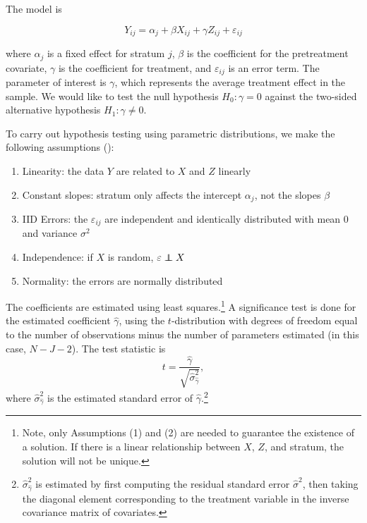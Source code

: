 \documentclass[11pt]{article}
\newcommand{\todo}[1]{{\color{red}{TO DO: \sc #1}}}
\newcommand{\eps}{\varepsilon}
\newcommand\independent{\protect\mathpalette{\protect\independenT}{\perp}}
\def\independenT#1#2{\mathrel{\rlap{$#1#2$}\mkern2mu{#1#2}}}
\begin{document}
The model is

$$Y_{ij} = \alpha_j + \beta X_{ij} + \gamma Z_{ij} + \eps_{ij}$$

where $\alpha_j$ is a fixed effect for stratum $j$, $\beta$ is the coefficient for the pretreatment covariate,
$\gamma$ is the coefficient for treatment,
and $\eps_{ij}$ is an error term.
The parameter of interest is $\gamma$, which represents the average treatment effect in the sample. 
We would like to test the null hypothesis $H_0: \gamma = 0$ against
the two-sided alternative hypothesis $H_1: \gamma \neq 0$.

To carry out hypothesis testing using parametric distributions, we make the following assumptions (\cite{freedman_statistical_2005}):

\begin{enumerate}
\item Linearity: the data $Y$ are related to $X$ and $Z$ linearly
\item Constant slopes: stratum only affects the intercept $\alpha_j$, not the slopes $\beta$
\item IID Errors: the $\eps_{ij}$ are independent and identically distributed with mean $0$ and variance $\sigma^2$
\item Independence: if $X$ is random, $\eps \independent X$
\item Normality: the errors are normally distributed
\end{enumerate}

The coefficients are estimated using least squares.\footnote{
Note, only Assumptions (1) and (2) are needed to guarantee the existence of a solution.
If there is a linear relationship between $X$, $Z$, and stratum, the solution will not be unique.
}
A significance test is done for the estimated coefficient $\hat{\gamma}$, using the $t$-distribution with degrees of freedom equal to the number of observations minus the number of parameters estimated (in this case, $N - J - 2$).
The test statistic is
$$ t = \frac{\hat{\gamma}}{\sqrt{ \hat{\sigma}_{\hat{\gamma}}^2}},$$
where $\hat{\sigma}_{\hat{\gamma}}^2$ is the estimated standard error of $\hat{\gamma}$.\footnote{
$\hat{\sigma}_{\hat{\gamma}}^2$ is estimated by first computing the residual standard error $\hat{\sigma}^2$,
then taking the diagonal element corresponding to the treatment variable in the inverse covariance matrix of covariates.
}

\todo{Add a paragraph about why this might go wrong, perhaps some citations. All depends on estimating the error variance correctly, because $t$ distribution is the ratio of a normal and a chi-square}
\end{document}
